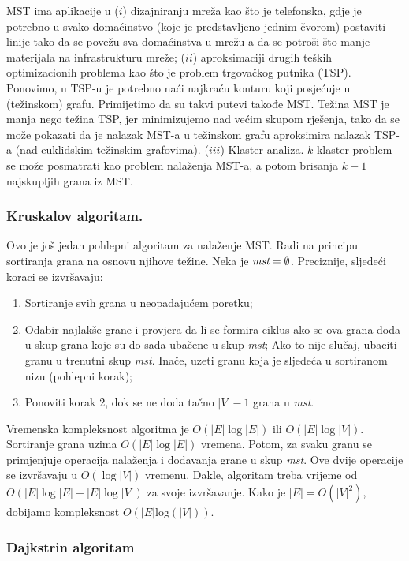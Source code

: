 \documentclass[a4paper, utf8, 11pt, colorlinks]{article}
\begin{document}
MST ima aplikacije u ($i$) dizajniranju mreža kao što je telefonska, gdje je potrebno u svako domaćinstvo (koje je predstavljeno jednim čvorom) postaviti linije tako da se povežu sva domaćinstva u mrežu a da se potroši što manje materijala na infrastrukturu mreže; ($ii$) aproksimaciji drugih teških optimizacionih problema kao što je problem trgovačkog putnika (TSP). Ponovimo, u TSP-u je potrebno naći najkraću konturu koji posjećuje u (težinskom) grafu. Primijetimo da su takvi putevi takođe MST. Težina MST je manja nego težina TSP, jer minimizujemo nad većim skupom rješenja, tako da se može pokazati da je nalazak MST-a u težinskom grafu aproksimira nalazak TSP-a (nad euklidskim težinskim grafovima).  
($iii$) Klaster analiza. $k$-klaster problem  se može posmatrati kao problem nalaženja MST-a, a potom brisanja $k-1$ najskupljih grana iz MST. 

\subsubsection{Kruskalov algoritam.}

Ovo je još jedan pohlepni algoritam za nalaženje MST. Radi na principu sortiranja 
grana na osnovu njihove težine. Neka je $\emph{mst} = \emptyset$. Preciznije, sljedeći koraci se izvršavaju:

\begin{enumerate}
	\item Sortiranje svih grana u neopadajućem poretku;
	\item Odabir najlakše grane i provjera da li se formira ciklus ako se ova 
	grana doda u skup grana koje su do sada ubačene u skup \emph{mst}; Ako to nije slučaj, ubaciti granu u trenutni skup \emph{mst}. Inače, uzeti granu koja je sljedeća u sortiranom nizu (pohlepni korak);
	\item Ponoviti korak 2, dok se ne doda tačno $|V|-1$ grana u \emph{mst}.
\end{enumerate} 

\noindent Vremenska kompleksnost algoritma je $O(|E|\log |E|)$ ili $O(|E|\log |V|)$. Sortiranje grana uzima $O(|E| \log|E|)$ vremena. Potom, za svaku granu 
se primjenjuje operacija nalaženja i dodavanja grane u skup \emph{mst}. Ove dvije operacije se izvršavaju u $O(\log |V|)$ vremenu. Dakle, algoritam treba vrijeme od $O(|E|\log |E| + |E|\log |V|)$ za svoje izvršavanje. Kako je $|E|=O(|V|^2)$, dobijamo kompleksnost $O(|E|\mathrm{log}(|V|))$. 

\subsubsection{Dajkstrin algoritam}
\end{document}

